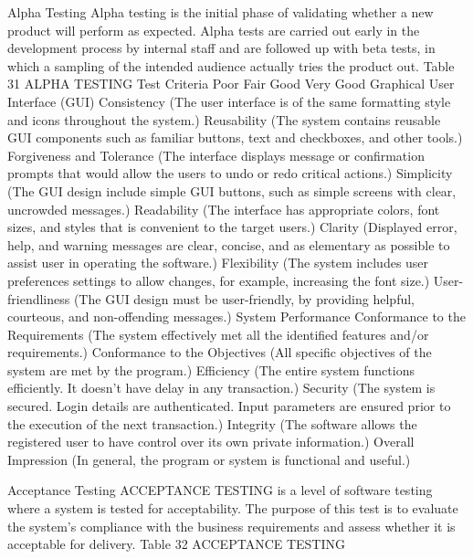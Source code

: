 Alpha Testing
	Alpha testing is the initial phase of validating whether a new product will perform as expected. Alpha tests are carried out early in the development process by internal staff and are followed up with beta tests, in which a sampling of the intended audience actually tries the product out.
Table 31
ALPHA TESTING
Test Criteria	Poor	Fair	Good	Very Good
Graphical User Interface (GUI)
Consistency (The user interface is of the same formatting style and icons throughout the system.)				
Reusability (The system contains reusable GUI components such as familiar buttons, text and checkboxes, and other tools.)				
Forgiveness and Tolerance (The interface displays message or confirmation prompts that would allow the users to undo or redo critical actions.)				
Simplicity (The GUI design include simple GUI buttons, such as simple screens with clear, uncrowded messages.)				
Readability (The interface has appropriate colors, font sizes, and styles that is convenient to the target users.)				
Clarity (Displayed error, help, and warning messages are clear, concise, and as elementary as possible to assist user in operating the software.)				
Flexibility (The system includes user preferences settings to allow changes, for example, increasing the font size.)				
User-friendliness (The GUI design must be user-friendly, by providing helpful, courteous, and non-offending messages.)				
System Performance
Conformance to the Requirements (The system effectively met all the identified features and/or requirements.)				
Conformance to the Objectives (All specific objectives of the system are met by the program.)				
Efficiency (The entire system functions efficiently. It doesn’t have delay in any transaction.)				
Security (The system is secured. Login details are authenticated. Input parameters are ensured prior to the execution of the next transaction.)				
Integrity (The software allows the registered user to have control over its own private information.)				
Overall Impression (In general, the program or system is functional and useful.)				















Acceptance Testing
	ACCEPTANCE TESTING is a level of software testing where a system is tested for acceptability. The purpose of this test is to evaluate the system's compliance with the business requirements and assess whether it is acceptable for delivery. 
		Table 32
ACCEPTANCE TESTING
  










